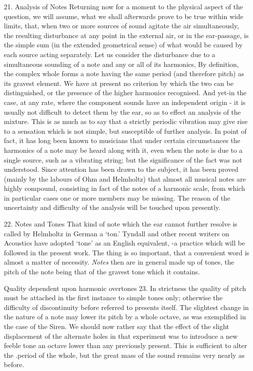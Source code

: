 21.  Analysis of Notes Returning now for a moment to the physical aspect of the
question, we will assume, what we shall afterwards prove to be true within wide
limits, that, when two or more sources of sound agitate the air simultaneously,
the resulting disturbance at any point in the external air, or in the
ear-passage, is the simple sum (in the extended geometrical sense) of what
would be caused by each source acting separately. Let us consider the
disturbance due to a simultaneous sounding of a note and any or all of its
harmonics, By definition, the complex whole forms a note having the same period
(and therefore pitch) as its gravest element. We have at present no criterion
by which the two can be distinguished, or the presence of the higher harmonics
recognised. And yet-in the case, at any rate, where the component sounds have
an independent origin - it is usually not difficult to detect them by the ear,
so as to effect an analysis of the mixture. This is as much as to say that a
strictly periodic vibration may give rise to a sensation which is not simple,
but susceptible of further analysis. In point of fact, it has long been known
to musicians that under certain circumstances the harmonics of a note may be
heard along with it, even when the note is due to a single source, such as a
vibrating string; but the significance of the fact was not understood. Since
attention has been drawn to the subject, it has been proved (mainly by the
labours of Ohm and Helmholtz) that almost all musical notes are highly
compound, consisting in fact of the notes of a harmonic scale, from which in
particular cases one or more members may be missing. The reason of the
uncertainty and difficulty of the analysis will be touched upon presently.

22.  Notes and Tones That kind of note which the ear cannot further resolve is
called by Helmholtz in German a `ton.' Tyndall and other recent writers on
Acoustics have adopted `tone' as an English equivalent, -a practice which will
be followed in the present work. The thing is so important, that a convenient
word is almost a matter of necessity. \textit{Notes} then are in general made
up of tones, the pitch of the note being that of the gravest tone which it
contains.

Quality dependent upon harmonic overtones 23. In strictness the quality of
pitch must be attached in the first instance to simple tones only; otherwise
the difficulty of discontinuity before referred to presents itself. The
slightest change in the nature of a note may lower its pitch by a whole octave,
as was exemplified in the case of the Siren. We should now rather say that the
effect of the slight displacement of the alternate holes in that experiment was
to introduce a new feeble tone an octave lower than any previously present.
This is sufficient to alter the .period of the whole, but the great mass of the
sound remains very nearly as before.

